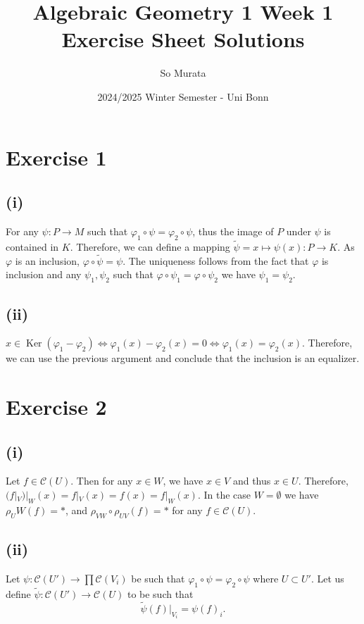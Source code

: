 \documentclass{article}
\title{Algebraic Geometry 1 Week 1 Exercise Sheet Solutions}
\author{So Murata}
\date{2024/2025 Winter Semester - Uni Bonn}
\DeclareMathOperator{\Ker}{Ker}
\begin{document}
\maketitle

\section*{Exercise 1}

\subsection*{(i)}
For any $\psi:P\to M$ such that $\varphi_1\circ\psi = \varphi_2\circ\psi$, thus the image of $P$ under $\psi$ is contained in $K$. Therefore, we can define a mapping $\tilde{\psi} = x\mapsto \psi(x):P\to K$. As $\varphi$ is an inclusion, $\varphi\circ\tilde{\psi}=\psi$. The uniqueness follows from the fact that $\varphi$ is inclusion and any $\psi_1,\psi_2$ such that $\varphi\circ\psi_1 = \varphi\circ\psi_2$ we have $\psi_1 = \psi_2$.

\subsection*{(ii)}
$x\in\Ker(\varphi_1-\varphi_2) \Leftrightarrow \varphi_1(x)-\varphi_2(x) = 0\Leftrightarrow \varphi_1(x)=\varphi_2(x)$. Therefore, we can use the previous argument and conclude that the inclusion is an equalizer.

\section*{Exercise 2}

\subsection{(i)}

Let $f\in\mathcal{C}(U)$. Then for any $x\in W$, we have $x\in V$ and thus $x\in U$. Therefore, $(f|_V)|_W(x) = f|_V(x) = f(x) = f|_W(x)$. In the case $W=\emptyset$ we have $\rho_UW(f) = *$, and $\rho_{VW}\circ\rho_{UV}(f) = *$ for any $f\in\mathcal{C}(U)$.

\subsection{(ii)}

Let $\psi:\mathcal{C}(U')\to \prod\mathcal{C}(V_i)$ be such that $\varphi_1\circ\psi=\varphi_2\circ\psi$ where $U\subset U'$. Let us define $\tilde{\psi}:\mathcal{C}(U')\to\mathcal{C}(U)$ to be such that 
\begin{equation*}
\tilde{\psi}(f)|_{V_i} = \psi(f)_i.
\end{equation*}
\end{document}
